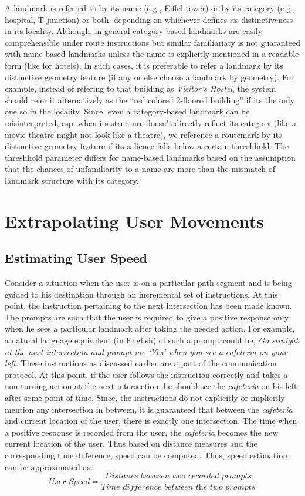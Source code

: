 \documentclass{iitkthesis}
\begin{document}
A landmark is referred to by its name (e.g., Eiffel tower) or by its 
category (e.g., hospital, T-junction) or both, depending on whichever 
defines its distinctiveness in its locality. Although, in general 
category-based landmarks are easily comprehensible under route 
instructions but similar familiariaty is not guaranteed with name-based 
landmarks unless the name is explicitly mentioned in a readable form 
(like for hotels). In such cases, it is preferable to refer a landmark by 
its distinctive geometry feature (if any or else choose a landmark by 
geometry). For example, instead of refering to that building as 
\textit{Visitor's Hostel}, the system should refer it alternatively as 
the ``red colored 2-floored building'' if its the only one so in the 
locality. Since, even a category-based landmark can be misinterpreted, esp. 
when its structure doesn't directly reflect its category (like a movie 
theatre might not look like a theatre), we reference a routemark by its 
distinctive geometry feature if its salience falls below a certain 
threshhold. The threshhold parameter differs for name-based landmarks 
based on the assumption that the chances of unfamiliarity to a name are 
more than the mismatch of landmark structure with its category.
\section{Extrapolating User Movements}
\subsection{Estimating User Speed}
Consider a situation when the user is on a particular path segment and 
is being guided to his destination through an incremental set of 
instructions. At this point, the instruction pertaining to the next 
intersection has been made known. The prompts are such that the user is 
required to give a positive response only when he sees a particular 
landmark after taking the needed action. For example, a natural language 
equivalent (in English) of such a prompt could be, \textit{Go straight at 
the next intersection and prompt me `Yes' when you see a cafeteria on 
your left}. These instructions as discussed earlier are a part of the 
communication protocol. At this point, if the user follows the 
instruction correctly and takes a non-turning action at the next 
intersection, he should see the \textit{cafeteria} on his left after some 
point of time. Since, the instructions do not explicitly or implicitly 
mention any intersection in between, it is guaranteed that between 
the \textit{cafeteria} and current location of the user, there is exactly 
one intersection. The time when a positive response is recorded from the 
user, the \textit{cafeteria} becomes the new current location of the user.
Thus based on distance measures and the corresponding time difference, 
speed can be computed. Thus, speed estimation can be approximated  as:
\[\displaystyle \textit{User Speed}=\frac{\textit{Distance between two recorded prompts}}{\textit{Time difference between the two prompts}}\]
\end{document}
